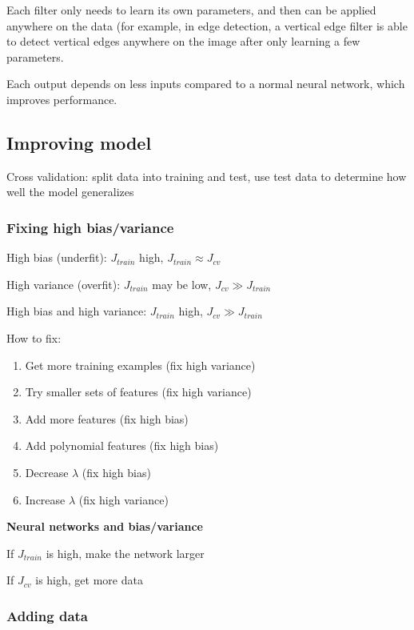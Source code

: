 \documentclass[12pt]{article}
\begin{document}
Each filter only needs to learn its own parameters, and then can be applied anywhere on the
data (for example, in edge detection, a vertical edge filter is able to detect vertical edges
anywhere on the image after only learning a few parameters.

Each output depends on less inputs compared to a normal neural network, which improves
performance.

\pagebreak

\subsection{Improving model}

Cross validation: split data into training and test, use test data to determine how well the model generalizes

\subsubsection{Fixing high bias/variance}

High bias (underfit): $J_{train}$ high, $J_{train} \approx J_{cv}$

High variance (overfit): $J_{train}$ may be low, $J_{cv} \gg J_{train}$

High bias and high variance: $J_{train}$ high, $J_{cv} \gg J_{train}$

How to fix:

\begin{enumerate}
\item Get more training examples (fix high variance)
\item Try smaller sets of features (fix high variance)
\item Add more features (fix high bias)
\item Add polynomial features (fix high bias)
\item Decrease $\lambda$ (fix high bias)
\item Increase $\lambda$ (fix high variance)
\end{enumerate}

\textbf{Neural networks and bias/variance}

If $J_{train}$ is high, make the network larger

If $J_{cv}$ is high, get more data

\subsubsection{Adding data}
\end{document}
